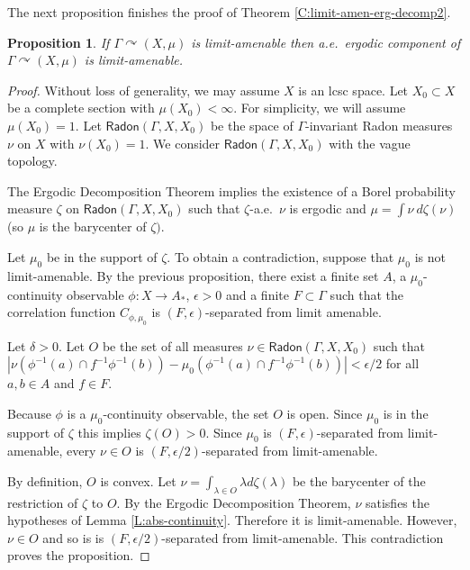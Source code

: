 \documentclass[12pt]{article}
\theoremstyle{plain}
\newtheorem{prop}[thm]{Proposition}
\theoremstyle{definition}
\theoremstyle{remark}
\newcommand{\G}{\Gamma}
\newcommand{\eps}{\epsilon}
\def\cc{{\curvearrowright}}
\begin{document}
The next proposition finishes the proof of Theorem \ref{C:limit-amen-erg-decomp2}. 

\begin{prop}\label{P:limit-amenability-to-ergodic-comp}
If $\G \cc (X,\mu)$ is limit-amenable then a.e.\ ergodic component of $\G \cc (X,\mu)$ is limit-amenable.
\end{prop}


\begin{proof}%
Without loss of generality, we may assume $X$ is an lcsc space. Let $X_0 \subset X$ be a complete section with $\mu(X_0)<\infty$. For simplicity, we will assume $\mu(X_0)=1$. Let $\mathsf{Radon}(\G,X,X_0)$ be the space of $\G$-invariant Radon measures $\nu$ on $X$ with $\nu(X_0)=1$. We consider $\mathsf{Radon}(\G,X,X_0)$ with the vague topology.

The Ergodic Decomposition Theorem implies the existence of a Borel probability measure $\zeta$ on $\mathsf{Radon}(\G,X,X_0)$ such that $\zeta$-a.e.\ $\nu$ is ergodic and $\mu = \int \nu ~d\zeta(\nu)$ (so $\mu$ is the barycenter of $\zeta)$.

Let $\mu_0$ be in the support of $\zeta$. To obtain a contradiction, suppose that $\mu_0$ is not limit-amenable. By the previous proposition, there exist a finite set $A$, a  $\mu_0$-continuity observable $\phi:X \to A_*$, $\eps>0$ and a finite $F \subset \G$ such that the correlation function $C_{\phi,\mu_0}$ is $(F,\eps)$-separated from limit amenable.


Let $\delta>0$. Let $O$ be the set of all measures $\nu \in \mathsf{Radon}(\G,X,X_0)$ such that $|\nu(\phi^{-1}(a) \cap f^{-1}\phi^{-1}(b) )-\mu_0(\phi^{-1}(a)\cap f^{-1}\phi^{-1}(b) )|<\eps/2$ 
for all $a,b \in A$ and $f \in F$. 

 Because $\phi$ is a $\mu_0$-continuity observable, the set $O$ is open. Since $\mu_0$ is in the support of $\zeta$ this implies $\zeta(O)>0$. Since $\mu_0$ is $(F,\eps)$-separated from limit-amenable, every $\nu \in O$ is $(F,\eps/2)$-separated from limit-amenable. 
 
By definition, $O$ is convex. Let $\nu = \int_{\lambda \in O} \lambda d\zeta(\lambda)$ be the barycenter of the restriction of $\zeta$ to $O$. By the Ergodic Decomposition Theorem, $\nu$ satisfies the hypotheses of Lemma \ref{L:abs-continuity}. Therefore it is limit-amenable. However, $\nu \in O$ and so is  is $(F,\eps/2)$-separated from limit-amenable. This contradiction proves the proposition. 
\end{proof}
\end{document}

